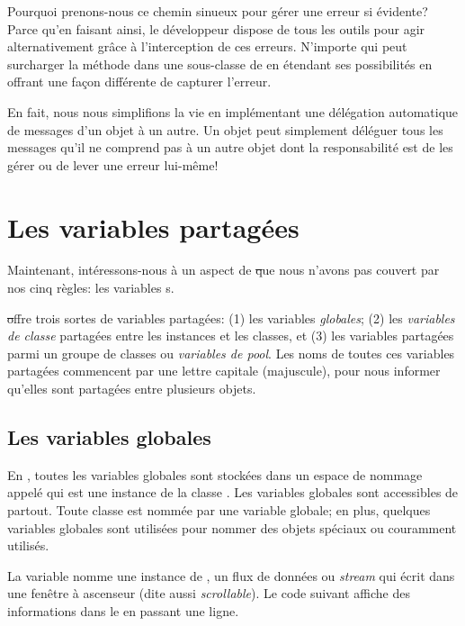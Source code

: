 \documentclass[a4paper,10pt,twoside]{book}
\begin{document}
Pourquoi prenons-nous ce chemin sinueux pour gérer une erreur si évidente?
Parce qu'en faisant ainsi, le développeur dispose de tous les outils pour
agir alternativement grâce à l'interception de ces erreurs.
N'importe qui peut surcharger la méthode  
dans une sous-classe de  en étendant ses possibilités en
offrant une façon différente de capturer l'erreur.

En fait, nous nous simplifions la vie en implémentant une 
délégation automatique de messages d'un objet à un autre.
Un objet  peut simplement déléguer tous les messages
qu'il ne comprend pas à un autre objet dont la responsabilité est de les gérer ou
de lever une erreur lui-même!

\section{Les variables partagées}

Maintenant, intéressons-nous à un aspect de \st que nous n'avons pas couvert
par nos cinq règles: les variables s.

\st offre trois sortes de variables partagées: (1) les variables \emph{globales}; (2) les \emph{variables de classe} partagées entre les instances et les classes, et (3) les variables partagées parmi un groupe de classes ou \emph{variables de pool}.  Les noms de toutes ces variables partagées commencent par une lettre capitale (majuscule), pour nous informer qu'elles sont partagées entre plusieurs objets.

\subsection{Les variables globales}
En \pharo, toutes les variables globales sont stockées dans un espace de nommage appelé  qui est une instance de la classe .
Les variables globales sont accessibles de partout.
Toute classe est nommée par une variable globale; en plus, quelques variables globales sont utilisées pour nommer des objets spéciaux ou couramment utilisés.  

La variable  nomme une instance de , un flux de données ou \emph{stream} qui écrit dans une fenêtre à ascenseur (dite aussi \emph{scrollable}).
Le code suivant affiche des informations dans le  en passant une ligne.
\end{document}
